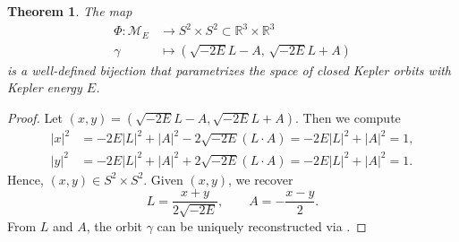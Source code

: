 \documentclass[10pt,a4paper]{amsart}
\newtheorem{thm}{Theorem}
\newcommand{\R}{\mathbb{R}}
\begin{document}
\begin{thm}\label{Theorem - Moduli parametrization}
	The map
	$$
	\begin{aligned}
		\Phi: \mathcal{M}_E &\to S^2 \times S^2 \subset \R^3\times \R^3 \\
		\gamma &\mapsto \left( \sqrt{-2E} L - A, \, \sqrt{-2E} L + A \right)
	\end{aligned}
	$$
	is a well-defined bijection that parametrizes the space of closed Kepler orbits with Kepler energy $E$.
\end{thm}

\begin{proof}
	Let $(x, y) = \left( \sqrt{-2E}L - A, \sqrt{-2E}L + A \right)$.
	Then we compute
	$$
	\begin{aligned}
		|x|^2 &= -2E|L|^2 + |A|^2 - 2\sqrt{-2E} (L\cdot A)  = -2E|L|^2 + |A|^2 = 1, \\
		|y|^2 &= -2E|L|^2 + |A|^2 + 2\sqrt{-2E} (L \cdot A) = -2E|L|^2 + |A|^2 = 1.
	\end{aligned}
	$$
	Hence, $(x, y) \in S^2 \times S^2$.
	Given $(x, y)$, we recover
	$$
	L = \frac{x + y}{2\sqrt{-2E}}, \qquad A = -\frac{x - y}{2}.
	$$
	From $L$ and $A$, the orbit $\gamma$ can be uniquely reconstructed via .
\end{proof}
\end{document}
